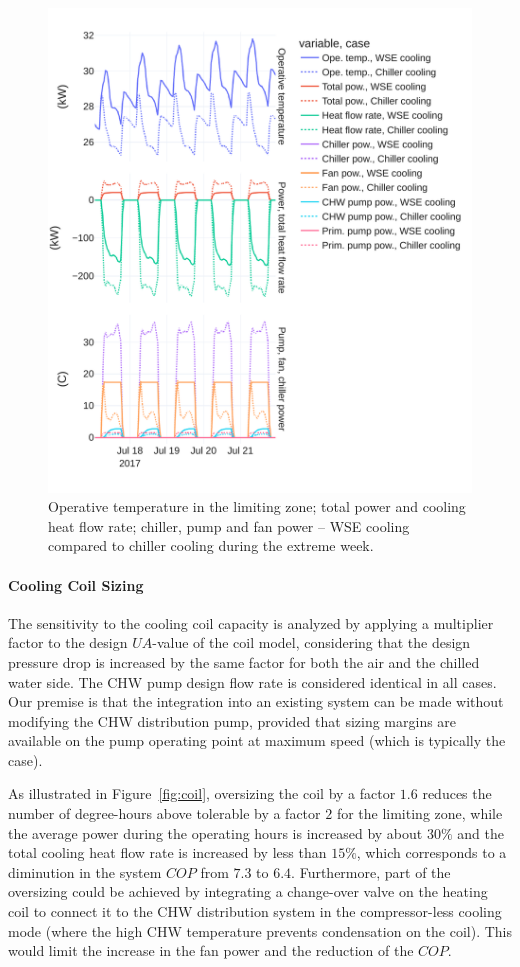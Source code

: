 \begin{figure}[!htbp]
    \centering
    \includegraphics[width=.7\linewidth]{../python_scripts/figures/TOpe.pdf}
    \caption{Operative temperature in the limiting zone; total power and cooling heat flow rate; chiller, pump and fan power -- WSE cooling compared to chiller cooling during the extreme week.}
    \label{fig:tope}
\end{figure}


\paragraph{Cooling Coil Sizing} \label{par:cooling_coil}

The sensitivity to the cooling coil capacity is analyzed by applying a multiplier factor to the design $UA$-value of the coil model,  considering that the design pressure drop is increased by the same factor for both the air and the chilled water side. The CHW pump design flow rate is considered identical in all cases.
Our premise is that the integration into an existing system can be made without modifying the CHW distribution pump, provided that sizing margins are available on the pump operating point at maximum speed (which is typically the case).

As illustrated in Figure~\ref{fig:coil}, oversizing the coil by a factor $1.6$ reduces the number of degree-hours above tolerable by a factor $2$ for the limiting zone, while the average power during the operating hours is increased by about $30\%$ and the total cooling heat flow rate is increased by less than $15\%$, which corresponds to a diminution in the system $COP$ from $7.3$ to $6.4$.
Furthermore, part of the oversizing could be achieved by integrating a change-over valve on the heating coil to connect it to the CHW distribution system in the compressor-less cooling mode (where the high CHW temperature prevents condensation on the coil). This would limit the increase in the fan power and the reduction of the $COP$.

